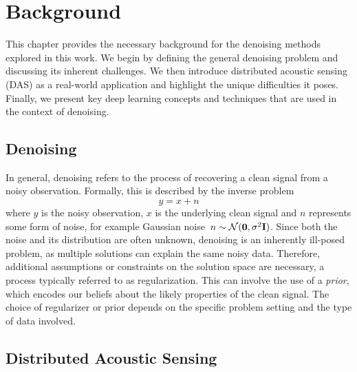 \chapter{Background}

This chapter provides the necessary background for the denoising methods explored in this work.
We begin by defining the general denoising problem and discussing its inherent challenges.
We then introduce distributed acoustic sensing (DAS) as a real-world application and highlight the unique difficulties it poses.
Finally, we present key deep learning concepts and techniques that are used in the context of denoising.

\section{Denoising}\label{sec:denoising}

In general, denoising refers to the process of recovering a clean signal from a noisy observation.
Formally, this is described by the inverse problem 
\begin{equation}
    y = x + n
\end{equation}
where $y$ is the noisy observation, $x$ is the underlying clean signal and $n$ represents some form of noise, for example Gaussian noise~$n \sim \mathcal{N}(\mathbf{0},\sigma^2\mathbf{I})$.
Since both the noise and its distribution are often unknown, denoising is an inherently ill-posed problem, as multiple solutions can explain the same noisy data.
Therefore, additional assumptions or constraints on the solution space are necessary, a process typically referred to as regularization.
This can involve the use of a \textit{prior}, which encodes our beliefs about the likely properties of the clean signal.
The choice of regularizer or prior depends on the specific problem setting and the type of data involved.

\section{Distributed Acoustic Sensing}

